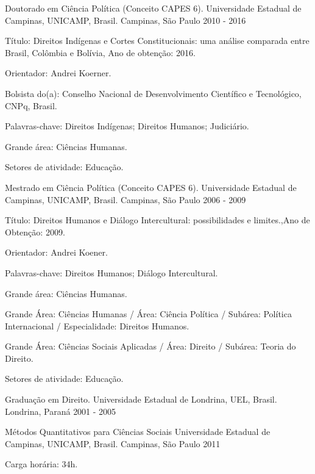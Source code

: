 \begin{cventries}
\cventry
{Doutorado em Ciência Política (Conceito CAPES 6).} %
{Universidade Estadual de Campinas, UNICAMP, Brasil.} %
{Campinas, São Paulo} %
{2010 - 2016} %
{
  \begin{cvitems} %
    \item Título: Direitos Indígenas e Cortes Constitucionais: uma análise comparada entre Brasil, Colômbia e Bolívia, Ano de obtenção: 2016.
    \item Orientador: Andrei Koerner.
    \item Bolsista do(a): Conselho Nacional de Desenvolvimento Científico e Tecnológico, CNPq, Brasil.
    \item Palavras-chave: Direitos Indígenas; Direitos Humanos; Judiciário.
    \item Grande área: Ciências Humanas.
    \item Setores de atividade: Educação.
  \end{cvitems}
}

\cventry
{Mestrado em Ciência Política (Conceito CAPES 6).}
{Universidade Estadual de Campinas, UNICAMP, Brasil.}
{Campinas, São Paulo}
{2006 - 2009}
{
\begin{cvitems}
  \item Título: Direitos Humanos e Diálogo Intercultural: possibilidades e limites.,Ano de Obtenção: 2009.
  \item Orientador: Andrei Koener.
  \item Palavras-chave: Direitos Humanos; Diálogo Intercultural.
  \item Grande área: Ciências Humanas.
  \item Grande Área: Ciências Humanas / Área: Ciência Política / Subárea: Política Internacional / Especialidade: Direitos Humanos.
  \item Grande Área: Ciências Sociais Aplicadas / Área: Direito / Subárea: Teoria do Direito.
  \item Setores de atividade: Educação.
 \end{cvitems}
}

\cventry
{Graduação em Direito.}
{Universidade Estadual de Londrina, UEL, Brasil.}
{Londrina, Paraná}
{2001 - 2005}
{}
\end{cventries}
\begin{cventries}
\cventry
        {Métodos Quantitativos para Ciências Sociais}
        {Universidade Estadual de Campinas, UNICAMP, Brasil.}
        {Campinas, São Paulo}
        {2011}
        {
         \begin{cvitems}
           \item Carga horária: 34h.
          \end{cvitems}
        }
\end{cventries}
